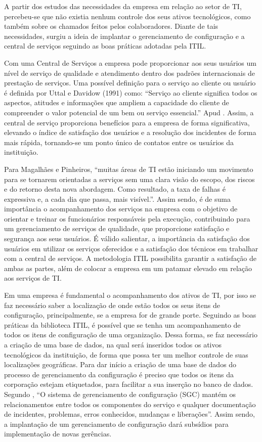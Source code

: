 \documentclass[eso]{bcc}
\begin{document}
A partir dos estudos das necessidades da empresa em relação ao setor de TI, percebeu-se que não existia nenhum controle dos seus ativos tecnológicos, como também sobre os chamados feitos pelos colaboradores. Diante de tais necessidades, surgiu a ideia de implantar o gerenciamento de configuração e a central de serviços seguindo as boas práticas adotadas pela ITIL. 

Com uma Central de Serviços a empresa pode proporcionar aos seus usuários um nível de serviço de qualidade e atendimento dentro dos padrões internacionais de prestação de serviços. Uma possível definição para o serviço ao cliente ou usuário é definida por Uttal e Davidow (1991) como: “Serviço ao cliente significa todos os aspectos, atitudes e informações que ampliem a capacidade do cliente de compreender o valor potencial de um bem ou serviço essencial.” Apud \cite[p.45]{magalhaes:2007}.  Assim, a central de serviço proporciona benefícios para a empresa de forma significativa, elevando o índice de satisfação dos usuários e a resolução dos incidentes de forma mais rápida, tornando-se um ponto único de contatos entre os usuários da instituição.

Para Magalhães e Pinheiros, “muitas áreas de TI estão iniciando um movimento para se tornarem orientadas a serviços sem uma clara visão do escopo, dos riscos e do retorno desta nova abordagem. Como resultado, a taxa de falhas é expressiva e, a cada dia que passa, mais visível.”\cite[p.37]{magalhaes:2007}. Assim sendo, é de suma importância o acompanhamento dos serviços na empresa com o objetivo de orientar e treinar os funcionários responsáveis pela execução, contribuindo para um gerenciamento de serviços de qualidade, que proporcione satisfação e segurança aos seus usuários. É válido salientar, a importância da satisfação dos usuários em utilizar os serviços oferecidos e a satisfação dos técnicos em trabalhar com a central de serviços. A metodologia ITIL possibilita garantir a satisfação de ambas as partes, além de colocar a empresa em um patamar  elevado em relação aos serviços de TI.

Em uma empresa é  fundamental  o acompanhamento dos ativos de TI, por isso se faz necessário saber a  localização de  onde estão todos os seus itens de configuração, principalmente, se a empresa for de grande porte. Seguindo as boas práticas da biblioteca ITIL, é possível que se tenha um acompanhamento de todos os itens de configuração de uma organização. Dessa forma, se faz necessário a criação de uma base de dados, na qual será inseridos todos os ativos tecnológicos da instituição, de forma que possa ter um melhor controle de suas localizações geográficas. Para dar início a criação de uma   base de dados do processo de gerenciamento da configuração é preciso que todos os itens da corporação estejam etiquetados, para facilitar a sua inserção no banco de dados. Segundo \cite[p.91]{filho:2011}, “O sistema de gerenciamento de configuração (SGC) mantém os relacionamentos entre todos os componentes do serviço e qualquer documentação de incidentes, problemas, erros conhecidos, mudanças e liberações”. Assim sendo, a implantação de um gerenciamento de configuração  dará subsídios para implementação de novas gerências. 
\end{document}
